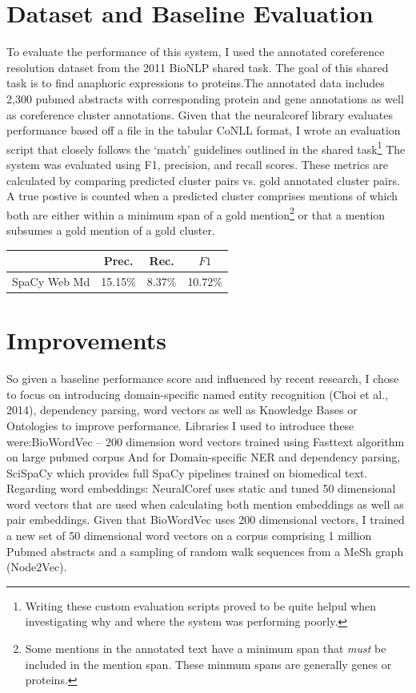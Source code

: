 \documentclass[11pt]{article}
\begin{document}
\section{Dataset and Baseline Evaluation}
To evaluate the performance of this system, I used the annotated coreference resolution dataset from the 2011 BioNLP shared task. The goal of this shared task is to find anaphoric expressions to proteins.The annotated data includes 2,300 pubmed abstracts with corresponding protein and gene annotations as well as coreference cluster annotations. Given that the neuralcoref library evaluates performance based off a file in the tabular CoNLL format, I wrote an evaluation script that closely follows the ‘match’ guidelines outlined in the shared task\footnote{Writing these custom evaluation scripts proved to be quite helpul when investigating why and where the system was performing poorly.}
The system was evaluated using F1, precision, and recall scores. These metrics are calculated by comparing predicted cluster pairs vs. gold annotated cluster pairs. A true postive is counted when a  predicted cluster comprises mentions of which both are either within a minimum span of a gold mention\footnote{Some mentions in the annotated text have a minimum span that \textit{must} be included in the mention span. These minmum spans are generally genes or proteins.} or that a mention subsumes a gold mention of a gold cluster. 

\begin{center}
 \begin{tabular}{||c c c c||} 
 \hline
  &  Prec.  & Rec. & $F1$ \\ [0.5ex] 
 \hline\hline
     SpaCy Web Md & 15.15\% & 8.37\% & 10.72\% \\ 
 \hline
\end{tabular}
\end{center}

\section{Improvements}
So given a baseline performance score and influenced by recent research, I chose to focus on introducing domain-specific named entity recognition (Choi et al., 2014), dependency parsing, word vectors as well as Knowledge Bases or Ontologies to improve performance. Libraries I used to introduce these were:BioWordVec – 200 dimension word vectors trained using Fasttext algorithm on large pubmed corpus
And for Domain-specific NER and dependency parsing, SciSpaCy which provides full SpaCy pipelines trained on biomedical text. 
Regarding word embeddings: NeuralCoref uses static and tuned 50 dimensional word vectors that are used when calculating both  mention embeddings as well as pair embeddings. Given that BioWordVec uses 200 dimensional vectors, I trained a new set of 50 dimensional word vectors on a corpus comprising 1 million Pubmed abstracts and a sampling of random walk sequences from a MeSh graph (Node2Vec).
\end{document}
